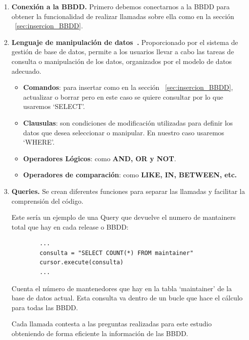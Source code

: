 \documentclass[a4paper, 12pt]{book}
\begin{document}
\begin{enumerate}
	\item \textbf{Conexión a la BBDD.} Primero debemos conectarnos a la BBDD para obtener la funcionalidad de realizar llamadas sobre ella como en la sección ~\ref{sec:insercion_BBDD}.
	
	\item \textbf{Lenguaje de manipulación de datos~\cite{geotalleres:_sql}.} Proporcionado por el sistema de gestión de base de datos, permite a los usuarios llevar a cabo las tareas de consulta o manipulación de los datos, organizados por el modelo de datos adecuado. 

	\begin{itemize}
		\item \textbf{Comandos}: para insertar como en la sección ~\ref{sec:insercion_BBDD}, actualizar o borrar pero en este caso se quiere consultar por lo que usaremos `SELECT'.
		
		\item \textbf{Clausulas}: son condiciones de modificación utilizadas para definir los datos que desea seleccionar o manipular. En nuestro caso usaremos `WHERE'.
		
		\item \textbf{Operadores Lógicos}: como \textbf{AND, OR y NOT}.
		
		\item \textbf{Operadores de comparación}: como \textbf{LIKE, IN, BETWEEN, etc.}
		
	\end{itemize}
	
	\item \textbf{Queries.} Se crean diferentes funciones para separar las llamadas y facilitar la comprensión del código. 
	
	
	
	Este sería un ejemplo de una Query que devuelve el numero de mantainers total que hay en cada release o BBDD:
	
	\begin{verbatim}
		...
		consulta = "SELECT COUNT(*) FROM maintainer"
		cursor.execute(consulta)
		...
	\end{verbatim} 
	
	Cuenta el número de mantenedores que hay en la tabla `maintainer' de la base de datos actual. Esta consulta va dentro de un bucle que hace el cálculo para todas las BBDD.
	
	Cada llamada contesta a las preguntas realizadas para este estudio obteniendo de forma eficiente la información de las BBDD.
	 
\end{enumerate}
\end{document}
